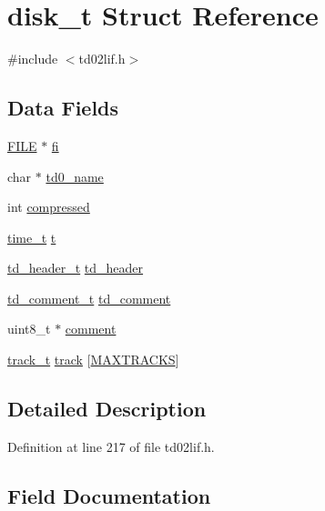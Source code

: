 \hypertarget{structdisk__t}{}\section{disk\+\_\+t Struct Reference}
\label{structdisk__t}


{\ttfamily \#include $<$td02lif.\+h$>$}

\subsection*{Data Fields}
\begin{DoxyCompactItemize}
\item 
\hyperlink{posix_8h_aed4dabeb9f7c518ded42f930a04abce8}{F\+I\+LE} $\ast$ \hyperlink{structdisk__t_a1832d0f8cdda8f731de9e1daea2900a5}{fi}
\item 
char $\ast$ \hyperlink{structdisk__t_a8be70c86aaffb22bab0e0969630a7062}{td0\+\_\+name}
\item 
int \hyperlink{structdisk__t_abe333f1a8b322fbed0d1c1178939016e}{compressed}
\item 
\hyperlink{time_8h_a3346b04b0420b32ccf6b706551b70762}{time\+\_\+t} \hyperlink{structdisk__t_a6cb7e0306f35b8b97bf3ef18e2f45455}{t}
\item 
\hyperlink{structtd__header__t}{td\+\_\+header\+\_\+t} \hyperlink{structdisk__t_a83cf946593922db2bdedef21bb7b4aff}{td\+\_\+header}
\item 
\hyperlink{structtd__comment__t}{td\+\_\+comment\+\_\+t} \hyperlink{structdisk__t_a7d84ffa6301a1e05b5a8a686d710bb8f}{td\+\_\+comment}
\item 
uint8\+\_\+t $\ast$ \hyperlink{structdisk__t_abd7a6652f29f0059638dab7a88558783}{comment}
\item 
\hyperlink{structtrack__t}{track\+\_\+t} \hyperlink{structdisk__t_a6498dff29cc11a772be6e0cabb54520f}{track} \mbox{[}\hyperlink{td02lif_8h_ade239296a2facdacc8b64d0791e2d806}{M\+A\+X\+T\+R\+A\+C\+KS}\mbox{]}
\end{DoxyCompactItemize}


\subsection{Detailed Description}


Definition at line 217 of file td02lif.\+h.



\subsection{Field Documentation}

